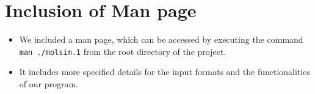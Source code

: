 \documentclass{article}
\begin{document}
\section{Inclusion of Man page}
\label{sec:man}

\begin{itemize}
    \item We included a man page, which can be accessed by executing the command \texttt{man ./molsim.1} from the root directory of the project.
    \item It includes more specified details for the input formats and the functionalities of our program.
\end{itemize}
\end{document}
